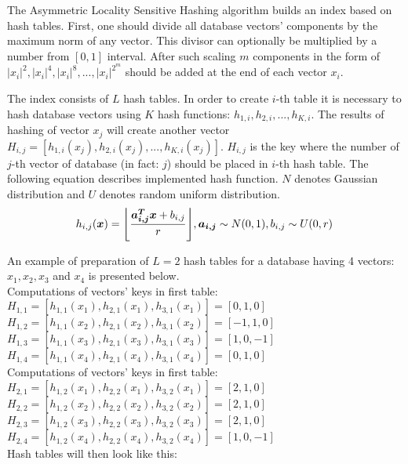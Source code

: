 The Asymmetric Locality Sensitive Hashing \cite{alsh} algorithm builds an index based on hash tables.
First, one should divide all database vectors' components by the maximum norm of any vector.
This divisor can optionally be multiplied by a number from  $[0,1]$ interval.
After such scaling $m$ components in the form of $|x_i|^2, |x_i|^4, |x_i|^8, ..., |x_i|^{2^m}$ should be added at the end of each vector $x_i$.
\par
The index consists of $L$ hash tables.
In order to create $i$-th table it is necessary to hash database vectors using $K$ hash functions: $h_{1,i}, h_{2,i}, ..., h_{K,i}$.
The results of hashing of vector $x_j$ will create another vector $H_{i,j} = [h_{1,i}(x_j), h_{2,i}(x_j), ..., h_{K,i}(x_j)]$. $H_{i,j}$ is the key where the number of $j$-th vector of database (in fact: $j$) should be placed in $i$-th hash table.
The following equation describes implemented hash function.
$N$ denotes Gaussian distribution and $U$ denotes random uniform distribution.
\begin{equation*}
h_{i,j}(\bm{x}) = \floor*{\frac{\bm{a_{i,j}^T x} + b_{i,j}}{r}}, \bm{a_{i,j}} \sim N(0,1), b_{i,j} \sim U(0,r)
\end{equation*}
\par
An example of preparation of $L = 2$ hash tables for a database having 4 vectors: $x_1, x_2, x_3$ and $x_4$ is presented below.
\\
Computations of vectors' keys in first table:\\
$H_{1,1} = [h_{1,1}(x_1), h_{2,1}(x_1), h_{3,1}(x_1)] = [0, 1, 0]$\\
$H_{1,2} = [h_{1,1}(x_2), h_{2,1}(x_2), h_{3,1}(x_2)] = [-1, 1, 0]$\\
$H_{1,3} = [h_{1,1}(x_3), h_{2,1}(x_3), h_{3,1}(x_3)] = [1, 0, -1]$\\
$H_{1,4} = [h_{1,1}(x_4), h_{2,1}(x_4), h_{3,1}(x_4)] = [0, 1, 0]$\\
Computations of vectors' keys in first table:\\
$H_{2,1} = [h_{1,2}(x_1), h_{2,2}(x_1), h_{3,2}(x_1)] = [2, 1, 0]$\\
$H_{2,2} = [h_{1,2}(x_2), h_{2,2}(x_2), h_{3,2}(x_2)] = [2, 1, 0]$\\
$H_{2,3} = [h_{1,2}(x_3), h_{2,2}(x_3), h_{3,2}(x_3)] = [2, 1, 0]$\\
$H_{2,4} = [h_{1,2}(x_4), h_{2,2}(x_4), h_{3,2}(x_4)] = [1, 0, -1]$\\
Hash tables will then look like this:

